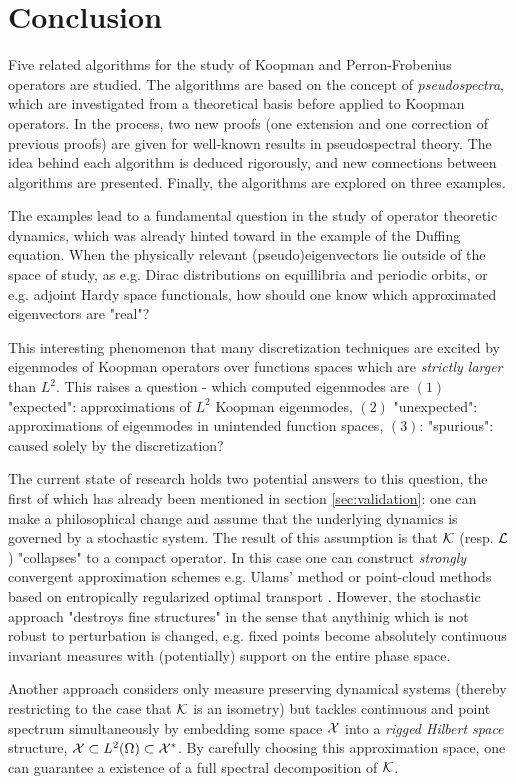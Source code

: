 
\section{Conclusion}

Five related algorithms for the study of Koopman and Perron-Frobenius operators are studied. 
The algorithms are based on the concept of \emph{pseudospectra}, which are investigated 
from a theoretical basis before applied to Koopman operators. In the process, two new 
proofs (one extension and one correction of previous proofs) are given for well-known 
results in pseudospectral theory. The idea behind each algorithm is deduced rigorously, 
and new connections between algorithms are presented. Finally, the algorithms are explored 
on three examples. 

The examples lead to a fundamental question in the study of operator theoretic dynamics, 
which was already hinted toward in the example of the Duffing equation. When the 
physically relevant (pseudo)eigenvectors lie outside of the space of study, as e.g. Dirac 
distributions on equillibria and periodic orbits, or e.g. adjoint Hardy space functionals, 
how should one know which approximated eigenvectors are "real"? 

This interesting phenomenon that many discretization techniques are excited by eigenmodes of 
Koopman operators over functions spaces which are \emph{strictly larger} than $L^2$. 
This raises a question - which computed eigenmodes are $(1)$ "expected": 
approximations of $L^2$ Koopman eigenmodes, $(2)$ "unexpected": approximations of 
eigenmodes in unintended function spaces, $(3)$: "spurious": caused solely by the 
discretization?

The current state of research holds two potential answers to this question, the first of 
which has already been mentioned in section \ref{sec:validation}: one can make a 
philosophical change and assume that the underlying dynamics is governed by a 
stochastic system. The result of this assumption is that $\mathcal{K}$ (resp. $\mathcal{L}$) 
"collapses" to a compact operator. In this case one can construct \emph{strongly} 
convergent approximation schemes e.g. Ulams' method \cite{attr} or point-cloud methods 
based on entropically regularized optimal transport \cite{entropic}. However, the 
stochastic approach "destroys fine structures" in the sense that anythinig which is 
not robust to perturbation is changed, e.g. fixed points become absolutely continuous 
invariant measures with (potentially) support on the entire phase space. 

Another approach \cite{rigged} considers only measure preserving dynamical systems 
(thereby restricting to the case that $\mathcal{K}$ is an isometry) but tackles continuous and 
point spectrum simultaneously by embedding some space $\mathcal{X}$ into a \emph{rigged Hilbert 
space} structure, $\mathcal{X} \subset L^2 (\Omega) \subset \mathcal{X}^*$. By carefully choosing this 
approximation space, one can guarantee a existence of a full spectral decomposition of 
$\mathcal{K}$. 



